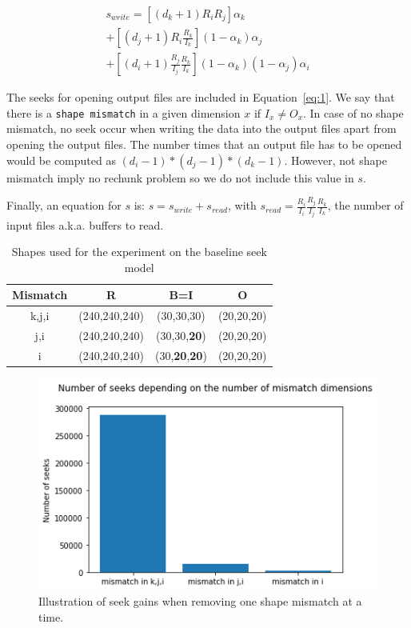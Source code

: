 \documentclass[conference]{IEEEtran}
\begin{document}
\begin{multline} \label{eq:1}
s_{write} = [(d_k+1)R_iR_j]\alpha_k \\ + [(d_j+1)R_i\frac{R_k}{I_k}](1-\alpha_k)\alpha_j \\ + [(d_i+1)\frac{R_j}{I_j}\frac{R_k}{I_k}](1-\alpha_k)(1-\alpha_j)\alpha_i
\end{multline}

The seeks for opening output files are included in Equation~\ref{eq:1}.
We say that there is a \texttt{shape mismatch} in a given dimension $x$ if
$I_x \neq O_x$.
In case of no shape mismatch, no seek occur when writing the data into the output
files apart from opening the output files. The number times that an output file
has to be opened would be computed as $(d_i-1)*(d_j-1)*(d_k-1)$. However, not
shape mismatch imply no rechunk problem so we do not include this value in $s$.

Finally, an equation for $s$ is: $s = s_{write} + s_{read}$,
with $s_{read} = \frac{R_i}{I_i} \frac{R_j}{I_j} \frac{R_k}{I_k}$, the number of
input files a.k.a. buffers to read.


 \begin{table}[ht]
  \centering
  \caption{Shapes used for the experiment on the baseline seek model}

   \begin{tabular}[t]{c c c c}
   \hline
   Mismatch & R & B=I & O \\
     \hline\hline
     k,j,i & (240,240,240) & (30,30,30) & (20,20,20) \\
     \hline
     j,i & (240,240,240) & (30,30,\textbf{20}) & (20,20,20) \\
     \hline
     i & (240,240,240) & (30,\textbf{20},\textbf{20}) & (20,20,20) \\
     \hline
   \end{tabular}

   \label{tab:expseekmodel}

\end{table}

\begin{figure}[h]
\centering
\includegraphics[scale=0.55]{./figures/baseline_math_model.png}
\caption{Illustration of seek gains when removing one shape mismatch at a time.
}
\label{fig:baseline_math_model}
\end{figure}
\end{document}
